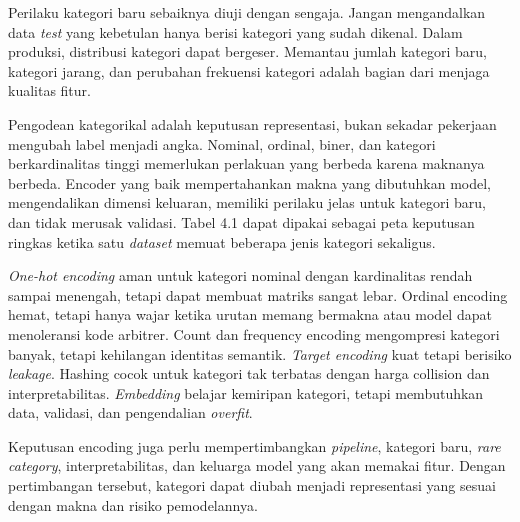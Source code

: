 Perilaku kategori baru sebaiknya diuji dengan sengaja. Jangan mengandalkan data \emph{test} yang kebetulan hanya berisi kategori yang sudah dikenal. Dalam produksi, distribusi kategori dapat bergeser. Memantau jumlah kategori baru, kategori jarang, dan perubahan frekuensi kategori adalah bagian dari menjaga kualitas fitur.

\begin{sintesis}

Pengodean kategorikal adalah keputusan representasi, bukan sekadar pekerjaan mengubah label menjadi angka. Nominal, ordinal, biner, dan kategori berkardinalitas tinggi memerlukan perlakuan yang berbeda karena maknanya berbeda. Encoder yang baik mempertahankan makna yang dibutuhkan model, mengendalikan dimensi keluaran, memiliki perilaku jelas untuk kategori baru, dan tidak merusak validasi. Tabel 4.1 dapat dipakai sebagai peta keputusan ringkas ketika satu \emph{dataset} memuat beberapa jenis kategori sekaligus.

\emph{One-hot encoding} aman untuk kategori nominal dengan kardinalitas rendah sampai menengah, tetapi dapat membuat matriks sangat lebar. Ordinal encoding hemat, tetapi hanya wajar ketika urutan memang bermakna atau model dapat menoleransi kode arbitrer. Count dan frequency encoding mengompresi kategori banyak, tetapi kehilangan identitas semantik. \emph{Target encoding} kuat tetapi berisiko \emph{leakage}. Hashing cocok untuk kategori tak terbatas dengan harga collision dan interpretabilitas. \emph{Embedding} belajar kemiripan kategori, tetapi membutuhkan data, validasi, dan pengendalian \emph{overfit}.

Keputusan encoding juga perlu mempertimbangkan \emph{pipeline}, kategori baru, \emph{rare category}, interpretabilitas, dan keluarga model yang akan memakai fitur. Dengan pertimbangan tersebut, kategori dapat diubah menjadi representasi yang sesuai dengan makna dan risiko pemodelannya.

\end{sintesis}

